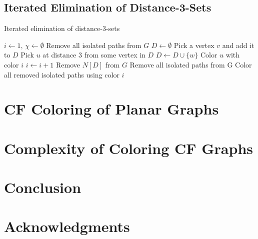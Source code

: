 \documentclass{sig-alternate}
\begin{document}
\subsection{Iterated Elimination of Distance-3-Sets}

\begin{algorithm}
\caption{Iterated elimination of distance-3-sets} \label{alg:elimination}
\begin{algorithmic}[1]
\State $i \gets 1$, $\chi \gets \emptyset$
\State Remove all isolated paths from $G$
	\State $D \gets \emptyset$
		\State Pick a vertex $v$ and add it to $D$
			\State Pick $u$ at distance 3 from some vertex in $D$
			\State $D \gets D \cup \{ w \}$
		\EndWhile
			\State Color $u$ with color $i$
		\EndFor
		\State $i \gets i + 1$
		\State Remove $N[D]$ from $G$
		\State Remove all isolated paths from G
	\EndFor
\EndWhile
\State Color all removed isolated paths using color $i$
\end{algorithmic}
\end{algorithm}


\section{CF Coloring of Planar Graphs}


\section{Complexity of Coloring CF Graphs}



\section{Conclusion}
\label{sec:conclusion}

\section{Acknowledgments}
\cite{abel2017three}




\end{document}
